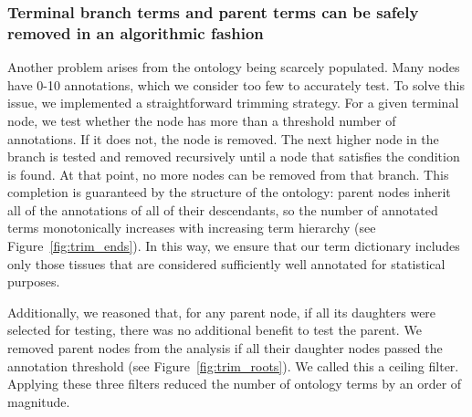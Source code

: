 \documentclass{bmcart}
\begin{document}
\subsubsection*{Terminal branch terms and parent terms can be
safely removed in an algorithmic fashion }
Another problem arises from the ontology being scarcely populated. Many nodes have 0-10 annotations, which we consider too few to accurately test. To solve this issue, we implemented a straightforward trimming strategy. For a given terminal node, we test whether the node has more than a threshold number of annotations. If it does not, the node is removed. The next higher node in the branch is tested and removed recursively until a node that satisfies the condition is found. At that point, no more nodes can be removed from that branch. This completion is guaranteed by the structure of the ontology: parent nodes inherit all of the annotations of all of their descendants, so the number of annotated terms monotonically increases with increasing term hierarchy (see Figure~\ref{fig:trim_ends}). In this way, we ensure that our term dictionary includes only those tissues that are considered sufficiently well annotated for statistical purposes.

Additionally, we reasoned that, for any parent node, if all its daughters were selected for testing, there was no additional benefit to test the parent. %
We removed parent nodes from the analysis if all their daughter nodes passed the annotation threshold (see Figure~\ref{fig:trim_roots}). We called this a ceiling filter. Applying these three filters reduced the number of ontology terms by an order of magnitude. 

\end{document}
